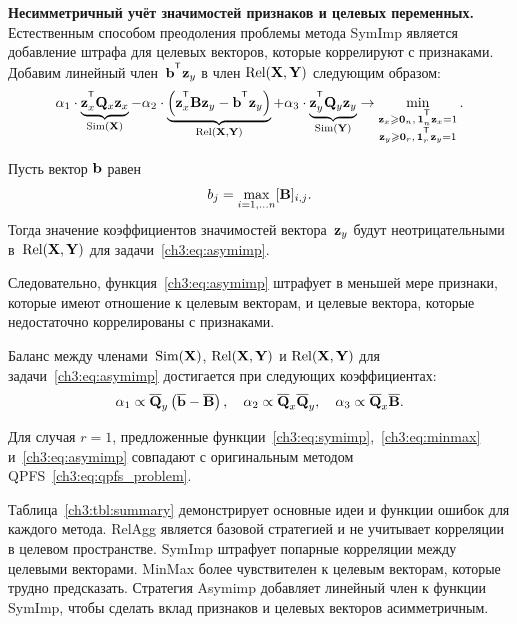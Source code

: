 \documentclass[11pt, a5paper]{dissert}
\begin{document}
\textbf{Несимметричный учёт значимостей признаков и целевых переменных.}
Естественным способом преодоления проблемы метода SymImp является добавление штрафа для целевых векторов, которые коррелируют с признаками.
Добавим линейный член~$\bb^{\T} \bz_y$ в член $\text{Rel}(\mathbf{X}, \mathbf{Y})$ следующим образом:
\begin{equation}
	\alpha_1 \cdot \underbrace{\bz_x^{\T} \bQ_x \bz_x}_{\text{Sim}(\bX)} - \alpha_2 \cdot  \underbrace{\left(\bz_x^{\T} \bB \bz_y - \bb^{\T} \bz_y \right) }_{\text{Rel}(\bX, \bY)} + \alpha_3 \cdot \underbrace{\bz_y^{\T} \bQ_y \bz_y}_{\text{Sim}(\bY)} \rightarrow \min_{\substack{\bz_x \geq \bZero_n, \, \bOne_n^{\T}\bz_x=1 \\ \bz_y \geq \bZero_r, \, \bOne_r^{\T}\bz_y=1}}.
	\label{ch3:eq:asymimp}
\end{equation}
\begin{statement}
	Пусть вектор $\mathbf{b}$ равен
	\begin{equation*}
	b_j = \max_{i=1, \dots n} [\mathbf{B}]_{i, j}.
	\end{equation*}
	Тогда значение коэффициентов значимостей вектора~$\mathbf{z}_y$ будут неотрицательными в~$\text{Rel}(\mathbf{X}, \mathbf{Y})$ для задачи~\eqref{ch3:eq:asymimp}.
\end{statement}
Следовательно, функция~\eqref{ch3:eq:asymimp} штрафует в меньшей мере признаки, которые имеют отношение к целевым векторам, и целевые вектора, которые недостаточно коррелированы с признаками.
\begin{statement}
	Баланс между членами~$\text{Sim}(\mathbf{X})$, $\text{Rel}(\mathbf{X}, \mathbf{Y})$ и $\text{Rel}(\mathbf{X}, \mathbf{Y})$ для задачи~\eqref{ch3:eq:asymimp} достигается при следующих коэффициентах:
	\begin{equation*}
		\alpha_1 \propto \overline{\mathbf{Q}}_y \left( \overline{\mathbf{b}} - \overline{\mathbf{B}}\right), \quad
		\alpha_2 \propto \overline{\mathbf{Q}}_x \overline{\mathbf{Q}}_y, \quad
		\alpha_3  \propto \overline{\mathbf{Q}}_x \overline{\mathbf{B}}.
	\end{equation*}
\end{statement}
\begin{statement}
	Для случая $r=1$, предложенные функции~\eqref{ch3:eq:symimp},~\eqref{ch3:eq:minmax} и~\eqref{ch3:eq:asymimp} совпадают с оригинальным методом QPFS~\eqref{ch3:eq:qpfs_problem}.
	
\end{statement}

Таблица~\ref{ch3:tbl:summary} демонстрирует основные идеи и функции ошибок для каждого метода. 
RelAgg является базовой стратегией и не учитывает корреляции в целевом пространстве.
SymImp штрафует попарные корреляции между целевыми векторами.
MinMax более чувствителен к целевым векторам, которые трудно предсказать.
Стратегия Asymimp добавляет линейный член к функции SymImp, чтобы сделать вклад признаков и целевых векторов асимметричным.
\end{document}
